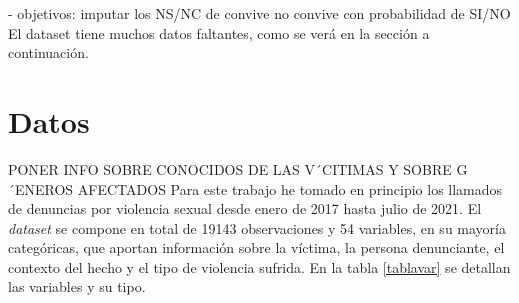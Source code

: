 \documentclass[10 pt]{article}
\begin{document}
- objetivos: imputar los NS/NC de convive no convive con probabilidad de SI/NO 
El dataset tiene muchos datos faltantes, como se verá en la sección  a continuación.


\section*{Datos}\label{datos}

PONER INFO SOBRE CONOCIDOS DE LAS V´CITIMAS Y SOBRE G´ENEROS AFECTADOS
Para este trabajo he tomado en principio los llamados de denuncias por violencia sexual desde enero de 2017 hasta julio de 2021. El \textit{dataset} se compone en total de 19143 observaciones y 54 variables, en su mayoría categóricas, que aportan información sobre la víctima, la persona denunciante, el contexto del hecho y el tipo de violencia sufrida. En la tabla \ref{tablavar} se detallan las variables y su tipo.
\end{document}
